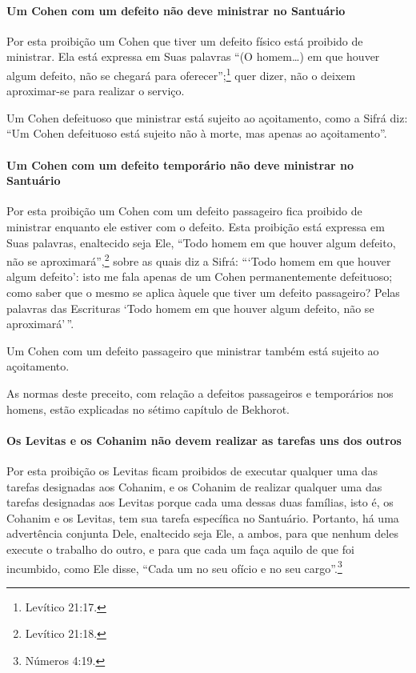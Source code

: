 \paragraph{Um Cohen com um defeito não deve ministrar no Santuário}

Por esta proibição um Cohen que tiver um defeito físico está
proibido de ministrar. Ela está expressa em Suas palavras ``(O homem\ldots{})
em que houver algum defeito, não se chegará para oferecer'';\footnote{Levítico
21:17.} quer dizer, não o deixem aproximar-se para realizar o serviço.

Um Cohen defeituoso que ministrar está sujeito ao açoitamento, como
a Sifrá diz: ``Um Cohen defeituoso está sujeito não à morte, mas
apenas ao açoitamento''.

\paragraph{Um Cohen com um defeito temporário não deve ministrar no Santuário}

Por esta proibição um Cohen com um defeito passageiro fica proibido
de ministrar enquanto ele estiver com o defeito. Esta proibição está
expressa em Suas palavras, enaltecido seja Ele, ``Todo homem em que
houver algum defeito, não se aproximará'',\footnote{Levítico 21:18.} sobre as
quais diz a Sifrá: ```Todo homem em que houver algum defeito': isto me
fala apenas de um Cohen permanentemente defeituoso; como saber que o mesmo se aplica àquele que tiver um defeito passageiro? Pelas palavras das Escrituras `Todo homem
em que houver algum defeito, não se aproximará'\,''.

Um Cohen com um defeito passageiro que ministrar também está
sujeito ao açoitamento.

As normas deste preceito, com relação a defeitos passageiros e
temporários nos homens, estão explicadas no sétimo capítulo de Bekhorot.

\paragraph{Os Levitas e os Cohanim não devem realizar as tarefas uns dos outros}

Por esta proibição os Levitas ficam proibidos de executar qualquer uma
das tarefas designadas aos Cohanim, e os Cohanim de realizar
qualquer uma das tarefas designadas aos Levitas porque cada uma dessas
duas famílias, isto é, os Cohanim e os Levitas, tem sua tarefa
específica no Santuário. Portanto, há uma advertência conjunta Dele,
enaltecido seja Ele, a ambos, para que nenhum deles execute o trabalho
do outro, e para que cada um faça aquilo de que foi incumbido, como Ele
disse, ``Cada um no seu ofício e no seu cargo''.\footnote{Números 4:19.}

